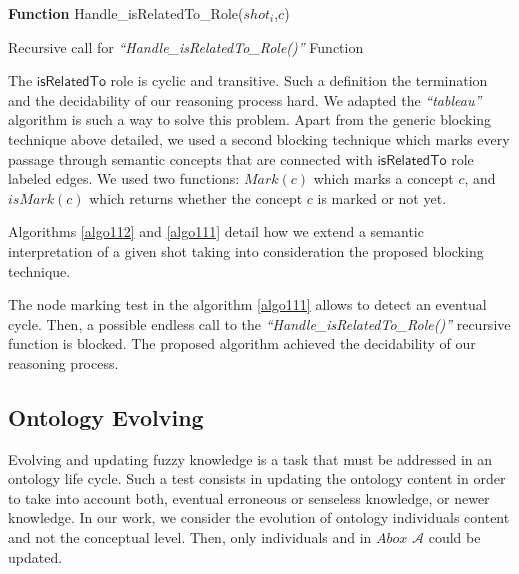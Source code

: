 		
		\begin{algorithm}
			
			\SetAlgoLined
			\textbf{Function} Handle\_isRelatedTo\_Role($shot_{i}$,$c$)\\
			  {
			}
			\caption{Recursive call for \emph{``Handle\_isRelatedTo\_Role()''} Function}
			\label{algo111}
		\end{algorithm}

		The $\mathsf{isRelatedTo}$ role is cyclic and transitive. Such a
		definition  the termination and the decidability of our reasoning process hard. We adapted 
		the \emph{``tableau''} algorithm is such a way to  solve this problem. 
		Apart from the generic blocking technique above detailed, we used a second 
		blocking technique which marks every passage through  
		semantic concepts that are connected with $\mathsf{isRelatedTo}$ role labeled
		edges. We used two functions: $Mark(c)$ which marks a concept $c$, and
 		$isMark(c)$ which returns whether the concept $c$ is marked or not yet.

		Algorithms \ref{algo112} and \ref{algo111} detail how we extend a semantic interpretation of a given
 		shot taking into consideration the proposed blocking technique. 

		The node marking test in the algorithm \ref{algo111} allows to detect an
 		eventual cycle. Then, a possible endless call to the
 		\emph{``Handle\_isRelatedTo\_Role()''} recursive function is blocked. 
		The proposed algorithm achieved the decidability of our reasoning process.

		\subsection{Ontology Evolving}
		\label{section:evolving}
		Evolving and updating fuzzy knowledge is a task that must be addressed in an ontology life cycle. 
		Such a test consists in updating the ontology content in order to take into account both, eventual erroneous 
		or senseless knowledge, or newer knowledge. In our work, we consider the evolution of ontology individuals content 
		and not the conceptual level. Then, only individuals and  in $Abox$ $\mathcal{A}$ 
		could be updated.

